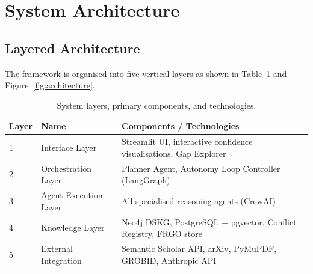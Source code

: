 \documentclass{llncs}
\begin{document}
\section{System Architecture}
\label{sec:architecture}

\subsection{Layered Architecture}

The framework is organised into five vertical layers as shown in
Table~\ref{tab:layers} and Figure~\ref{fig:architecture}.

\begin{table}[htbp]
\centering
\caption{System layers, primary components, and technologies.}
\label{tab:layers}
\begin{tabular}{llp{4.5cm}}
\toprule
\textbf{Layer} & \textbf{Name} & \textbf{Components / Technologies} \\
\midrule
1 & Interface Layer       & Streamlit UI, interactive confidence visualisations, Gap Explorer \\
2 & Orchestration Layer   & Planner Agent, Autonomy Loop Controller (LangGraph) \\
3 & Agent Execution Layer & All specialised reasoning agents (CrewAI) \\
4 & Knowledge Layer       & Neo4j DSKG, PostgreSQL + pgvector, Conflict Registry, FRGO store \\
5 & External Integration  & Semantic Scholar API, arXiv, PyMuPDF, GROBID, Anthropic API \\
\bottomrule
\end{tabular}
\end{table}
\end{document}
